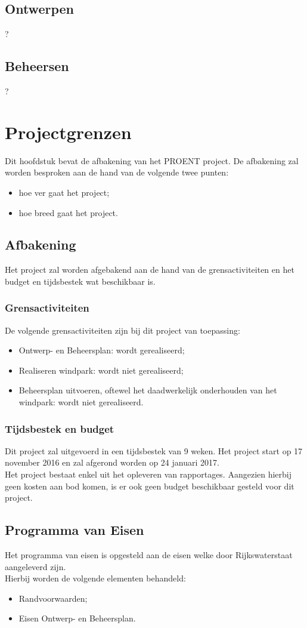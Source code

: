 \documentclass[numbers=endperiod]{scrartcl}
\newcommand{\whitespace}{\vspace*{2 mm} \\}%
\begin{document}
	\subsection{Ontwerpen}
	?
	\subsection{Beheersen}
	?
	
	\section{Projectgrenzen}
	Dit hoofdstuk bevat de afbakening van het PROENT project. De afbakening zal worden besproken aan de hand van de volgende twee punten:
	\begin{itemize}[noitemsep]
		\item hoe ver gaat het project;
		\item hoe breed gaat het project.
	\end{itemize}
	\subsection{Afbakening}
	Het project zal worden afgebakend aan de hand van de grensactiviteiten en het budget en tijdsbestek wat beschikbaar is.
	\subsubsection{Grensactiviteiten}
	De volgende grensactiviteiten zijn bij dit project van toepassing:
	\begin{itemize}
		\item Ontwerp- en Beheersplan: wordt gerealiseerd;
		\item Realiseren windpark: wordt niet gerealiseerd;
		\item Beheersplan uitvoeren, oftewel het daadwerkelijk onderhouden van het windpark: wordt niet gerealiseerd.
	\end{itemize}
	\subsubsection{Tijdsbestek en budget}
	Dit project zal uitgevoerd in een tijdsbestek van 9 weken. Het project start op 17 november 2016 en zal afgerond worden op 24 januari 2017.
	\whitespace
	Het project bestaat enkel uit het opleveren van rapportages. Aangezien hierbij geen kosten aan bod komen, is er ook geen budget beschikbaar gesteld voor dit project.
	\subsection{Programma van Eisen}
	Het programma van eisen is opgesteld aan de eisen welke door Rijkswaterstaat aangeleverd zijn.
	\whitespace
	Hierbij worden de volgende elementen behandeld:
	\begin{itemize}[noitemsep]
		\item Randvoorwaarden;
		\item Eisen Ontwerp- en Beheersplan.
	\end{itemize}
\end{document}
